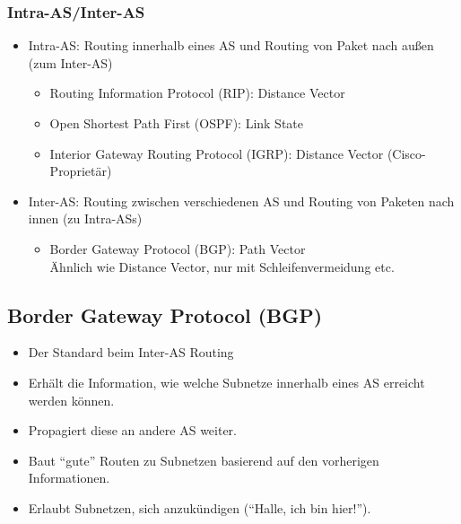             \subsubsection{Intra-AS/Inter-AS}
                \begin{itemize}
                	\item Intra-AS: Routing innerhalb eines AS und Routing von Paket nach außen (zum Inter-AS)
                    	\begin{itemize}
                    		\item Routing Information Protocol (RIP): Distance Vector
                    		\item Open Shortest Path First (OSPF): Link State
                    		\item Interior Gateway Routing Protocol (IGRP): Distance Vector (Cisco-Proprietär)
                    	\end{itemize}
                	\item Inter-AS: Routing zwischen verschiedenen AS und Routing von Paketen nach innen (zu Intra-ASs)
                    	\begin{itemize}
                    		\item Border Gateway Protocol (BGP): Path Vector \\ Ähnlich wie Distance Vector, nur mit Schleifenvermeidung etc.
                    	\end{itemize}
                \end{itemize}

        \subsection{Border Gateway Protocol (BGP)}
            \begin{itemize}
            	\item Der Standard beim Inter-AS Routing
            	\item Erhält die Information, wie welche Subnetze innerhalb eines AS erreicht werden können.
            	\item Propagiert diese an andere AS weiter.
            	\item Baut \enquote{gute} Routen zu Subnetzen basierend auf den vorherigen Informationen.
            	\item Erlaubt Subnetzen, sich anzukündigen (\enquote{Halle, ich bin hier!}).
            \end{itemize}

